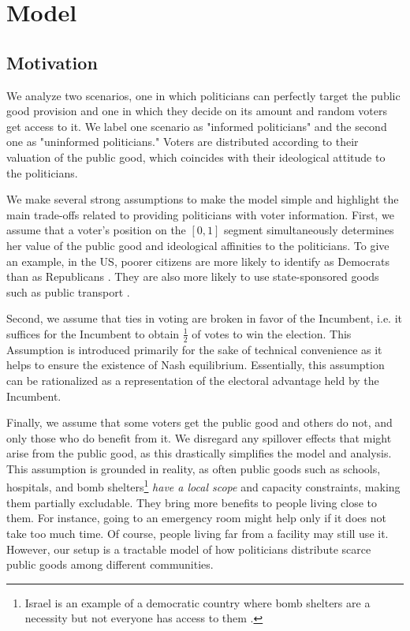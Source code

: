 \documentclass[12pt,english]{article}
\begin{document}
\section{Model} \label{sect-model}

\subsection{Motivation}


We analyze two scenarios, one in which politicians can perfectly target the public good provision and one in which they decide on its amount and random voters get access to it. We label one scenario as "informed politicians" and the second one as "uninformed politicians." Voters are distributed according to their valuation of the public good, which coincides with their ideological attitude to the politicians.

We make several strong assumptions to make the model simple and highlight the main trade-offs related to providing politicians with voter information. First, we assume that a voter's position on the $[0,1]$ segment simultaneously determines her value of the public good and ideological affinities to the politicians. To give an example, in the US, poorer citizens are more likely to identify as Democrats than as Republicans \citep{PewResearch2023}. They are also more likely to use state-sponsored goods such as public transport \citep{vox2015}.

Second, we assume that ties in voting are broken in favor of the Incumbent, i.e. it suffices for the Incumbent to obtain $\frac{1}{2}$ of votes to win the election. 
This Assumption is introduced primarily for the sake of technical convenience as it helps to
ensure the existence of Nash equilibrium. Essentially, this assumption can be rationalized as a representation of the electoral advantage held by the Incumbent.

Finally, we assume that some voters get the public good and others do not, and only those who do benefit from it. We disregard any spillover effects that might arise from the public good, as this drastically simplifies the model and analysis. This assumption is grounded in reality, as often public goods such as schools, hospitals, and bomb shelters\footnote{Israel is an example of a democratic country where bomb shelters are a necessity but not everyone has access to them \citep{timesofisrael2023}.} \emph{have a local scope} and capacity constraints, making them partially excludable. They bring more benefits to people living close to them. For instance, going to an emergency room might help only if it does not take too much time. Of course, people living far from a facility may still use it. However, our setup is a tractable model of how politicians distribute scarce public goods among different communities. 
\end{document}
